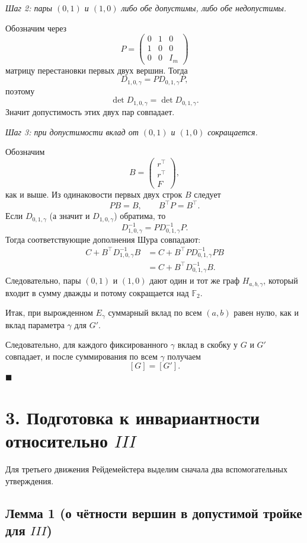 \documentclass[12pt,a4paper]{article}
\begin{document}
\textit{Шаг 2: пары $(0,1)$ и $(1,0)$ либо обе допустимы, либо обе недопустимы.}

Обозначим через
\[
P=
\begin{pmatrix}
0&1&0\\
1&0&0\\
0&0&I_m
\end{pmatrix}
\]
матрицу перестановки первых двух вершин.
Тогда
\[
D_{1,0,\gamma}=P D_{0,1,\gamma} P,
\]
поэтому
\[
\det D_{1,0,\gamma}=\det D_{0,1,\gamma}.
\]
Значит допустимость этих двух пар совпадает.

\textit{Шаг 3: при допустимости вклад от $(0,1)$ и $(1,0)$ сокращается.}

Обозначим
\[
B=\begin{pmatrix}r^\top\\r^\top\\F\end{pmatrix},
\]
как и выше. Из одинаковости первых двух строк $B$ следует
\[
PB=B,\qquad B^\top P=B^\top.
\]
Если $D_{0,1,\gamma}$ (а значит и $D_{1,0,\gamma}$) обратима, то
\[
D_{1,0,\gamma}^{-1}=P D_{0,1,\gamma}^{-1} P.
\]
Тогда соответствующие дополнения Шура совпадают:
\[
\begin{aligned}
C+B^\top D_{1,0,\gamma}^{-1}B
&=C+B^\top P D_{0,1,\gamma}^{-1} P B\\
&=C+B^\top D_{0,1,\gamma}^{-1} B.
\end{aligned}
\]
Следовательно, пары $(0,1)$ и $(1,0)$ дают один и тот же граф
$H_{a,b,\gamma}$, который входит в сумму дважды и потому
сокращается над $\mathbb F_2$.

Итак, при вырожденном $E_\gamma$ суммарный вклад по всем $(a,b)$
равен нулю, как и вклад параметра $\gamma$ для $G'$.

Следовательно, для каждого фиксированного $\gamma$ вклад в скобку у $G$ и $G'$ совпадает,
и после суммирования по всем $\gamma$ получаем
\[
[G]=[G'].
\]
$\blacksquare$

\section*{3. Подготовка к инвариантности относительно $III$}

Для третьего движения Рейдемейстера выделим сначала два вспомогательных утверждения.

\subsection*{Лемма 1 (о чётности вершин в допустимой тройке для $III$)}
\end{document}
